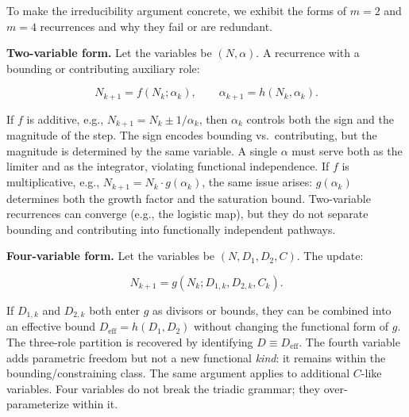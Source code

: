 \documentclass[
  11pt,
  letterpaper,
]{article}
\begin{document}
To make the irreducibility argument concrete, we exhibit the forms of
\(m = 2\) and \(m = 4\) recurrences and why they fail or are redundant.

\textbf{Two-variable form.} Let the variables be \((N, \alpha)\). A
recurrence with a bounding or contributing auxiliary role:

\[N_{k+1} = f(N_k; \alpha_k), \qquad \alpha_{k+1} = h(N_k, \alpha_k).\]

If \(f\) is additive, e.g., \(N_{k+1} = N_k \pm 1/\alpha_k\), then
\(\alpha_k\) controls both the sign and the magnitude of the step. The
sign encodes bounding vs.~contributing, but the magnitude is determined
by the same variable. A single \(\alpha\) must serve both as the limiter
and as the integrator, violating functional independence. If \(f\) is
multiplicative, e.g., \(N_{k+1} = N_k \cdot g(\alpha_k)\), the same
issue arises: \(g(\alpha_k)\) determines both the growth factor and the
saturation bound. Two-variable recurrences can converge (e.g., the
logistic map), but they do not separate bounding and contributing into
functionally independent pathways.

\textbf{Four-variable form.} Let the variables be \((N, D_1, D_2, C)\).
The update:

\[N_{k+1} = g(N_k; D_{1,k}, D_{2,k}, C_k).\]

If \(D_{1,k}\) and \(D_{2,k}\) both enter \(g\) as divisors or bounds,
they can be combined into an effective bound
\(D_{\text{eff}} = h(D_1, D_2)\) without changing the functional form of
\(g\). The three-role partition is recovered by identifying
\(D \equiv D_{\text{eff}}\). The fourth variable adds parametric freedom
but not a new functional \emph{kind}: it remains within the
bounding/constraining class. The same argument applies to additional
\(C\)-like variables. Four variables do not break the triadic grammar;
they over-parameterize within it.
\end{document}

